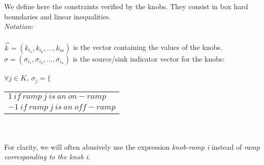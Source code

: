 We define here the constraints verified by the knobs. They consist in box hard boundaries and linear inequalities.
\\
\emph{Notation:}\\
\\
$\vec{k}=(k_{i_{1}},k_{i_{2}},...,k_{i{\kappa}})$ is the vector containing the values of the knobs.\\
$\sigma=(\sigma_{i_{1}},\sigma_{i_{2}},...,\sigma_{i_{\kappa}})$ is the source/sink indicator vector for the knobs: \\
\\
$\forall j\in{K}, \ \sigma_{j}=\bigg\{$
\begin{tabular}{l}
	$1\ if\ ramp\ j\ is\ an\ on-ramp$ \\
	$-1\ if\ ramp\ j\ is\ an\ off-ramp$ \\
\end{tabular}\\
\\
For clarity, we will often abusively use the expression \emph{knob-ramp i} instead of \emph{ramp corresponding to the knob i}.